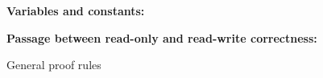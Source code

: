\begin{figure}
\begin{mdframed}
    \medskip

    \textbf{Variables and constants:}
    \begin{mathpar}



    \end{mathpar}

\medskip

    \textbf{Passage between read-only and read-write correctness:}
    \begin{mathpar}

    \end{mathpar}

  \end{mdframed}
  \caption{General proof rules}
  \label{fig:rules-general}
\end{figure}


